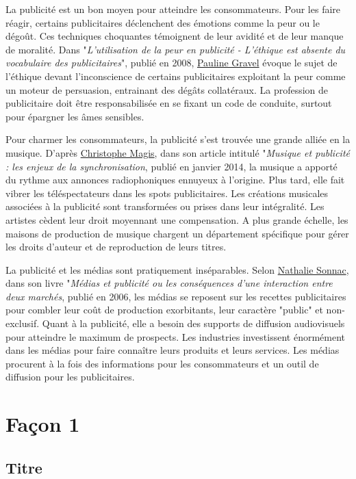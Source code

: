 \documentclass[11pt]{article}
\begin{document}
La publicité est un bon moyen pour atteindre les consommateurs. Pour les faire réagir, certains publicitaires déclenchent des émotions comme la peur ou le dégoût. Ces techniques choquantes témoignent de leur avidité et de leur manque de moralité. Dans "\textit{L'utilisation de la peur en publicité - L'éthique est absente du vocabulaire des publicitaires}", publié en 2008, \underline{Pauline Gravel} évoque le sujet de l'éthique devant l'inconscience de certains publicitaires exploitant la peur comme un moteur de persuasion, entrainant des dégâts collatéraux. La profession de publicitaire doit être responsabilisée en se fixant un code de conduite, surtout pour épargner les âmes sensibles.

Pour charmer les consommateurs, la publicité s'est trouvée une grande alliée en la musique. D'après \underline{Christophe Magis}, dans son article intitulé "\textit{Musique et publicité : les enjeux de la synchronisation}, publié en janvier 2014, la musique a apporté du rythme aux annonces radiophoniques ennuyeux à l'origine. Plus tard, elle fait vibrer les téléspectateurs dans les spots publicitaires. Les créations musicales associées à la publicité sont transformées ou prises dans leur intégralité. Les artistes cèdent leur droit moyennant une compensation. A plus grande échelle, les maisons de production de musique chargent un département spécifique pour gérer les droits d'auteur et de reproduction de leurs titres.

La publicité et les médias sont pratiquement inséparables. Selon \underline{Nathalie Sonnac}, dans son livre "\textit{Médias et publicité ou les conséquences d’une interaction entre deux marchés}, publié en 2006, les médias se reposent sur les recettes publicitaires pour combler leur coût de production exorbitants, leur caractère "public" et non-exclusif. Quant à la publicité, elle a besoin des supports de diffusion audiovisuels pour atteindre le maximum de prospects. Les industries investissent énormément dans les médias pour faire connaître leurs produits et leurs services. Les médias procurent à la fois des informations pour les consommateurs et un outil de diffusion pour les publicitaires.

\newpage

\section{Façon 1}

\subsection{Titre}
\end{document}
